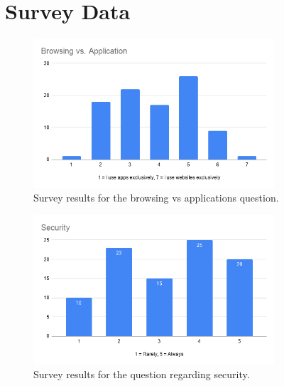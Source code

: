\section{Survey Data}
\label{appendix:b}
\begin{figure}[ht]
	\centering 
    \includegraphics[width=0.8\textwidth]{img/Browsing_vs_Application_survey.png}
	\hfill
	\caption{\label{fig:Browser_application_data}{Survey results for the browsing vs applications question.}}
\end{figure}
\begin{figure}[ht]
	\centering 
    \includegraphics[width=0.8\textwidth]{img/Security_survey.png}
	\hfill
	\caption{\label{fig:Security_data}{Survey results for the question regarding security.}}
\end{figure}


